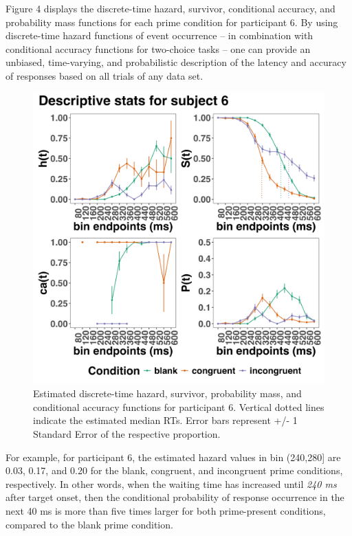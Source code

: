\documentclass[
  man, donotrepeattitle,floatsintext]{apa6}
\begin{document}
Figure 4 displays the discrete-time hazard, survivor, conditional accuracy, and probability mass functions for each prime condition for participant 6. By using discrete-time hazard functions of event occurrence -- in combination with conditional accuracy functions for two-choice tasks -- one can provide an unbiased, time-varying, and probabilistic description of the latency and accuracy of responses based on all trials of any data set.



\begin{figure}[H]

{\centering \includegraphics[width=21.33in,height=0.67\textheight,]{../Tutorial_1_descriptive_stats/figures/Plot_for_subject6_PanisSchmidt} 

}

\caption{Estimated discrete-time hazard, survivor, probability mass, and conditional accuracy functions for participant 6. Vertical dotted lines indicate the estimated median RTs. Error bars represent +/- 1 Standard Error of the respective proportion.}\label{fig:eha-plot}
\end{figure}

For example, for participant 6, the estimated hazard values in bin (240,280{]} are 0.03, 0.17, and 0.20 for the blank, congruent, and incongruent prime conditions, respectively. In other words, when the waiting time has increased until \emph{240 ms} after target onset, then the conditional probability of response occurrence in the next 40 ms is more than five times larger for both prime-present conditions, compared to the blank prime condition.
\end{document}
